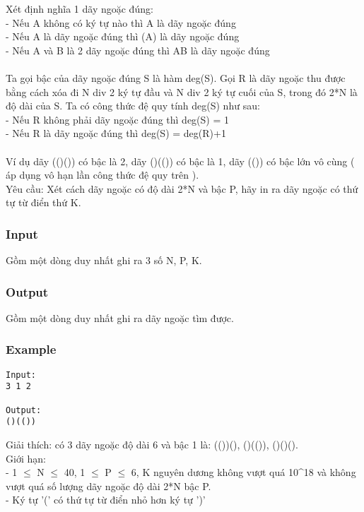 



   Xét định nghĩa 1 dãy ngoặc đúng:   
\\   - Nếu A không có ký tự nào thì A là dãy ngoặc đúng   
\\   - Nếu A là dãy ngoặc đúng thì (A) là dãy ngoặc đúng   
\\   - Nếu A và B là 2 dãy ngoặc đúng thì AB là dãy ngoặc đúng   
\\
\\   Ta gọi bậc của dãy ngoặc đúng S là hàm deg(S). Gọi R là dãy ngoặc thu được bằng cách xóa đi N div 2 ký tự đầu và N div 2 ký tự cuối của S, trong đó 2*N là độ dài của S. Ta có công thức đệ quy tính deg(S) như sau:   
\\   - Nếu R không phải dãy ngoặc đúng thì deg(S) = 1   
\\   - Nếu R là dãy ngoặc đúng thì deg(S) = deg(R)+1   
\\
\\   Ví dụ dãy (()()) có bậc là 2, dãy ()(()) có bậc là 1, dãy (()) có bậc lớn vô cùng ( áp dụng vô hạn lần công thức đệ quy trên ).   
\\   Yêu cầu: Xét cách dãy ngoặc có độ dài 2*N và bậc P, hãy in ra dãy ngoặc có thứ tự từ điển thứ K.  

\subsubsection{   Input  }

   Gồm một dòng duy nhất ghi ra 3 số N, P, K.  

\subsubsection{   Output  }

   Gồm một dòng duy nhất ghi ra dãy ngoặc tìm được.  

\subsubsection{   Example  }
\begin{verbatim}
Input:
3 1 2

Output:
()(())
\end{verbatim}

   Giải thích: có 3 dãy ngoặc độ dài 6 và bậc 1 là: (())(), ()(()), ()()().   
\\   Giới hạn:   
\\   - 1  $\le$  N  $\le$  40, 1  $\le$  P  $\le$  6, K nguyên dương không vượt quá 10\textasciicircum18 và không vượt quá số lượng dãy ngoặc độ dài 2*N bậc P.   
\\   - Ký tự '(' có thứ tự từ điển nhỏ hơn ký tự ')'  
